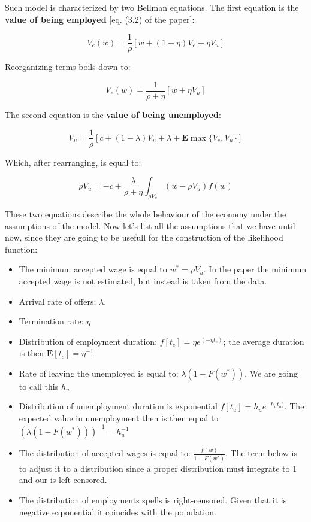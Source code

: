 \documentclass[]{book}
\begin{document}
Such model is characterized by two Bellman equations. The first equation
is the \textbf{value of being employed} {[}eq. (3.2) of the paper{]}:

\[ V_e(w) =  \frac{1}{\rho}[w + (1-\eta)V_e + \eta V_u]\]

Reorganizing terms boils down to:

\[V_e(w) = \frac{1}{\rho + \eta}[w + \eta V_u ]\]

The second equation is the \textbf{value of being unemployed}:

\[V_u = \frac{1}{\rho}[c+(1-\lambda)V_u+ \lambda + \mathbf{E} \max \lbrace V_e, V_u \rbrace]\]

Which, after rearranging, is equal to:

\[\rho V_u = -c + \frac{\lambda}{\rho + \eta} \int_{\rho V_u}(w-\rho V_u)f(w)\]

These two equations describe the whole behaviour of the economy under
the assumptions of the model. Now let's list all the assumptions that we
have until now, since they are going to be usefull for the construction
of the likelihood function:

\begin{itemize}
\item
  The minimum accepted wage is equal to \(w^* = \rho V_u\). In the paper
  the minimum accepted wage is not estimated, but instead is taken from
  the data.
\item
  Arrival rate of offers: \(\lambda\).
\item
  Termination rate: \(\eta\)
\item
  Distribution of employment duration: \(f[t_e]= \eta e^{(-\eta t_e)}\);
  the average duration is then \(\mathbf{E}[t_e]= \eta^{-1}\).
\item
  Rate of leaving the unemployed is equal to: \(\lambda (1- F(w^*))\).
  We are going to call this \(h_u\)
\item
  Distribution of unemployment duration is exponential
  \(f[t_u]= h_u e^{-h_u t_u)}\). The expected value in unemployment then
  is then equal to \((\lambda (1- F(w^*)))^{-1}=h_u^{-1}\)
\item
  The distribution of accepted wages is equal to:
  \(\frac{f(w)}{1 - F(w^*)}\). The term below is to adjust it to a
  distribution since a proper distribution must integrate to 1 and our
  is left censored.
\item
  The distribution of employments spells is right-censored. Given that
  it is negative exponential it coincides with the population.
\end{itemize}
\end{document}
